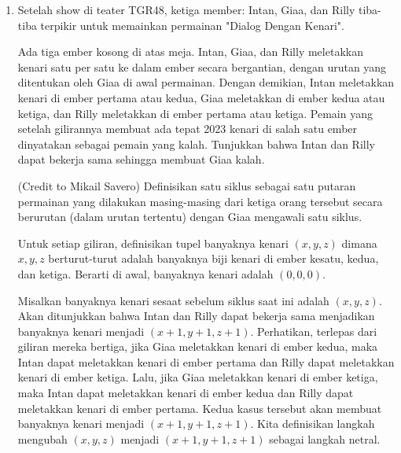 \documentclass[12pt]{scrartcl}
\begin{document}
\begin{enumerate}[resume]
\begin{solusi}
\begin{itemize}
        \item Jika $p(k)=\pm 1$, misalkan tanpa mengurangi keumuman $(k-a)=\pm3$. Berarti $(k-b), (k-c), (k-d) \in \{-1,1\}$ yang menurut PHP, haruslah setidaknya ada dua diantara mereka bernilai sama, kontradiksi dengan fakta bahwa $a,b,c,d$ semuanya berbeda.
        \end{itemize}
        
        Berarti terbukti bahwa tak ada bilangan bulat $k$ sehingga $f(k)=8$. \qed
    \end{solusi}

    \newpage
    \item Setelah show di teater TGR48, ketiga member: Intan, Giaa, dan Rilly tiba-tiba terpikir untuk memainkan permainan "Dialog Dengan Kenari".
    
    Ada tiga ember kosong di atas meja. Intan, Giaa, dan Rilly meletakkan kenari satu per satu ke dalam ember secara bergantian, dengan urutan yang ditentukan oleh Giaa di awal permainan. Dengan demikian, Intan meletakkan kenari di ember pertama atau kedua, Giaa meletakkan di ember kedua atau ketiga, dan Rilly meletakkan di ember pertama atau ketiga. Pemain yang setelah gilirannya membuat ada tepat 2023 kenari di salah satu ember dinyatakan sebagai pemain yang kalah. Tunjukkan bahwa Intan dan Rilly dapat bekerja sama sehingga membuat Giaa kalah.
    \begin{solusi}
        (Credit to Mikail Savero)
        Definisikan satu siklus sebagai satu putaran permainan yang dilakukan masing-masing dari ketiga orang tersebut secara berurutan (dalam urutan tertentu) dengan Giaa mengawali satu siklus.

        Untuk setiap giliran, definisikan tupel banyaknya kenari $(x,y,z)$ dimana $x,y,z$ berturut-turut adalah banyaknya biji kenari di ember kesatu, kedua, dan ketiga. Berarti di awal, banyaknya kenari adalah $(0,0,0)$. 

        Misalkan banyaknya kenari sesaat sebelum siklus saat ini adalah $(x,y,z)$. Akan ditunjukkan bahwa Intan dan Rilly dapat bekerja sama menjadikan banyaknya kenari menjadi $(x+1,y+1,z+1)$. Perhatikan, terlepas dari giliran mereka bertiga, jika Giaa meletakkan kenari di ember kedua, maka Intan dapat meletakkan kenari di ember pertama dan Rilly dapat meletakkan kenari di ember ketiga. Lalu, jika Giaa meletakkan kenari di ember ketiga, maka Intan dapat meletakkan kenari di ember kedua dan Rilly dapat meletakkan kenari di ember pertama. Kedua kasus tersebut akan membuat banyaknya kenari menjadi $(x+1, y+1, z+1)$. Kita definisikan langkah mengubah $(x,y,z)$ menjadi $(x+1,y+1,z+1)$ sebagai langkah netral.


\end{solusi}
\end{enumerate}
\end{document}
